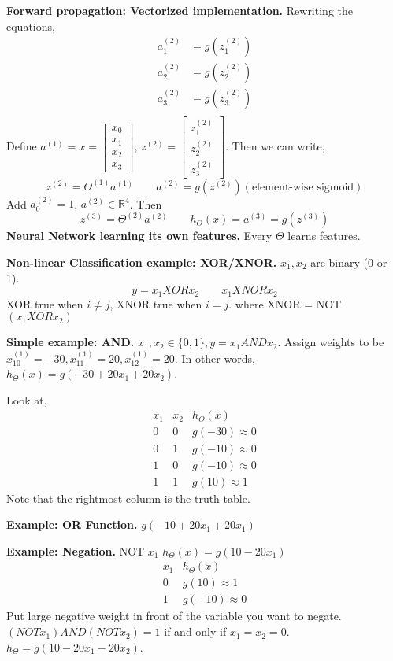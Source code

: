\documentclass[a4 paper, 11 pt]{article}
\begin{document}
\textbf{Forward propagation: Vectorized implementation.}
Rewriting the equations,
\begin{align*}
a_1^{(2)} &= g(z_1^{(2)}) \\
a_2^{(2)} &= g(z_2^{(2)}) \\
a_3^{(2)} &= g(z_3^{(2)}) \\
\end{align*}
Define $a^{(1)} = x = \begin{bmatrix} x_0 \\ x_1 \\ x_2 \\ x_3 \end{bmatrix}$, $z^{(2)} = \begin{bmatrix} z_1^{(2)} \\ z_2^{(2)} \\ z_3^{(2)}\end{bmatrix}$. Then we can write,
\[
z^{(2)} = \Theta^{(1)}a^{(1)} \qquad a^{(2)} = g(z^{(2)}) (\text{element-wise sigmoid})
\]
Add $a_0^{(2)} = 1$, $a^{(2)} \in \mathbb{R}^4$. Then
\[
z^{(3)} = \Theta^{(2)}a^{(2)} \qquad h_\Theta(x) = a^{(3)} = g(z^{(3)})
\]
\textbf{Neural Network learning its own features.} Every $\Theta$ learns features.

\textbf{Non-linear Classification example: XOR/XNOR.} $x_1, x_2$ are binary (0 or 1).
\[
y = x_1 XOR x_2 \qquad x_1 XNOR x_2
\]
XOR true when $i \ne j$, XNOR true when $ i = j$.
where XNOR = NOT $(x_1 XOR x_2)$

\textbf{Simple example: AND.} $x_1, x_2 \in \{0,1\}, y = x_1 AND x_2.$ Assign weights to be $x^{(1)}_10 = -30, x^{(1)}_11 = 20, x^{(1)}_12 = 20$. In other words, $h_\Theta(x) = g(-30 + 20x_1 + 20x_2)$.

Look at,
\[
\begin{array}{cc|c}
x_1 & x_2 & h_\Theta(x) \\ \hline
0 & 0 & g(-30) \approx 0 \\
0 & 1 & g(-10) \approx 0 \\
1 & 0 & g(-10) \approx 0 \\
1 & 1 & g(10) \approx 1
\end{array}
\]
Note that the rightmost column is the truth table.

\textbf{Example: OR Function.} $g(-10 + 20x_1 + 20x_1)$

\textbf{Example: Negation.} NOT $x_1$ $h_\Theta(x) = g(10 - 20x_1)$
\[
\begin{array}{c|c}
x_1 & h_\Theta(x) \\ \hline
0 & g(10) \approx 1 \\
1 & g(-10) \approx 0
\end{array}
\]
Put large negative weight in front of the variable you want to negate. $(NOT x_1) AND (NOT x_2) = 1$ if and only if $x_1 = x_2 = 0$. $h_\Theta = g(10 -20x_1 -20x_2)$.
\end{document}
